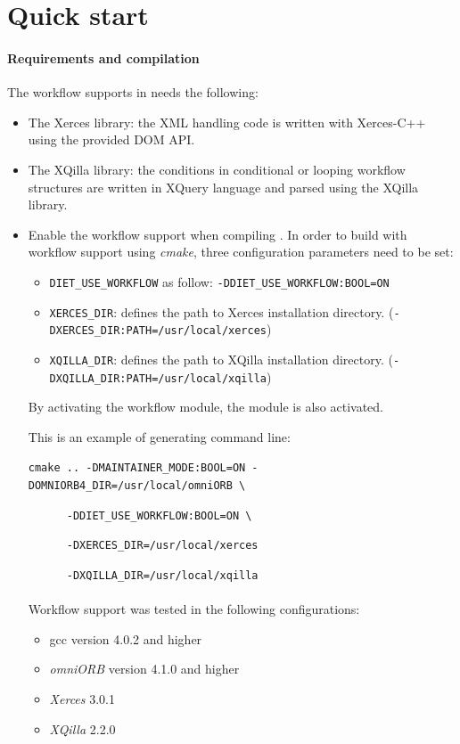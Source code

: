 \section{Quick start}

\paragraph{Requirements and compilation}

The workflow supports in \diet needs the following:

\begin{itemize}
\item The Xerces library: the XML handling code is written with Xerces-C++
  using the provided DOM API.
\item The XQilla library: the conditions in conditional or looping workflow
  structures are written in XQuery language and parsed using the XQilla
  library.
\item Enable the workflow support when compiling \diet. In order to build \diet
  with workflow support using \textit{cmake}, three configuration parameters
  need to be set:

\begin{itemize}
\item \texttt{DIET\_USE\_WORKFLOW} as follow: \texttt{-DDIET\_USE\_WORKFLOW:BOOL=ON}
\item \texttt{XERCES\_DIR}: defines the path to Xerces installation directory.
  (\eg \texttt{-DXERCES\_DIR:PATH=/usr/local/xerces})
\item \texttt{XQILLA\_DIR}: defines the path to XQilla installation directory.
  (\eg \texttt{-DXQILLA\_DIR:PATH=/usr/local/xqilla})
\end{itemize}

\begin{remarque}
By activating the workflow module, the \dagda module is also activated.
\end{remarque}

This is an example of generating command line:

\verb|cmake .. -DMAINTAINER_MODE:BOOL=ON -DOMNIORB4_DIR=/usr/local/omniORB \|

\verb|      -DDIET_USE_WORKFLOW:BOOL=ON \|

\verb|      -DXERCES_DIR=/usr/local/xerces|

\verb|      -DXQILLA_DIR=/usr/local/xqilla|

\paragraph{}
Workflow support was tested in the following configurations:

\begin{itemize}
\item gcc version 4.0.2 and higher
\item \textit{omniORB} version 4.1.0 and higher
\item \textit{Xerces} 3.0.1
\item \textit{XQilla} 2.2.0
\end{itemize}
\end{itemize}

